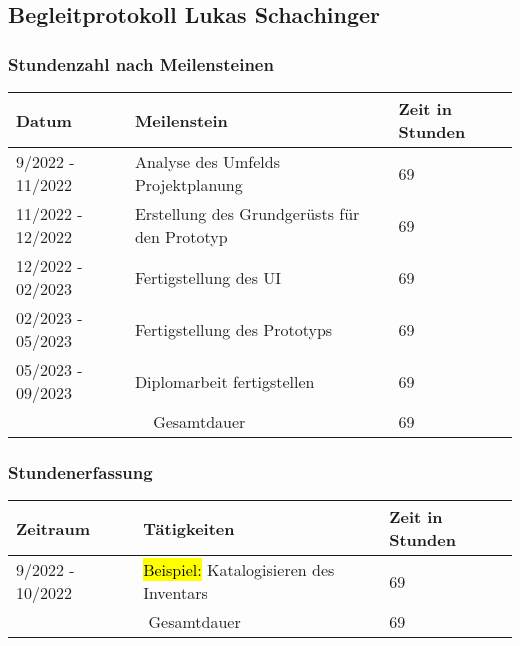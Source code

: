 \pagebreak

\subsection{Begleitprotokoll Lukas Schachinger}

\subsubsection{Stundenzahl nach Meilensteinen}

\begin{tabular}{|m{}|m{}|m{}|}
    \hline
    \cellcolor{gray!10} Datum & \cellcolor{gray!10} Meilenstein & \cellcolor{gray!10} Zeit in Stunden \\
    \hline
    9/2022 - 11/2022 & Analyse des Umfelds Projektplanung & 69 \\
    \hline
    11/2022 - 12/2022 & Erstellung des Grundgerüsts für den Prototyp & 69 \\
    \hline
    12/2022 - 02/2023 & Fertigstellung des UI & 69 \\
    \hline
    02/2023 - 05/2023 & Fertigstellung des Prototyps & 69 \\
    \hline
    05/2023 - 09/2023 & Diplomarbeit fertigstellen & 69 \\ 
    \hline
    \multicolumn{2}{|c|}{\cellcolor{gray!30}Gesamtdauer} & 69 \\
    \hline
\end{tabular}

\noindent

\vspace{40pt}

\subsubsection{Stundenerfassung}

\begin{tabular}{|m{}|m{}|m{}|}
    \hline
    \cellcolor{gray!10} Zeitraum & \cellcolor{gray!10} Tätigkeiten & \cellcolor{gray!10} Zeit in Stunden \\
    \hline
    9/2022 - 10/2022 & \hl{Beispiel: } Katalogisieren des Inventars & 69 \\
    \hline
    \multicolumn{2}{|c|}{\cellcolor{gray!30}Gesamtdauer} & 69 \\
    \hline
\end{tabular}

\pagebreak